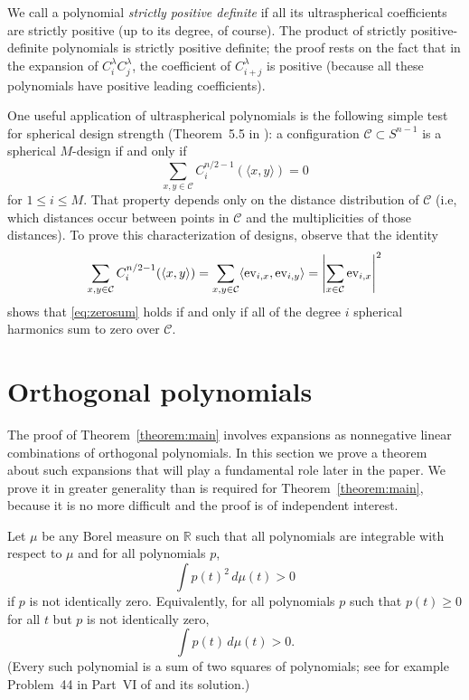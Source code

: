 \documentclass{jams-l}
\theoremstyle{plain}
\numberwithin{theorem}{section}
\theoremstyle{definition}
\numberwithin{equation}{section}
\newcommand{\R}{{\mathbb R}}
\newcommand{\ev}{\mathop{\textup{ev}}\nolimits}
\newcommand{\CodeS}{\mathcal{C}}
\begin{document}
We call a polynomial \textit{strictly positive definite\/} if all
its ultraspherical coefficients are strictly positive (up to its
degree, of course).  The product of strictly positive-definite
polynomials is strictly positive definite;  the proof rests on the
fact that in the expansion of $C_i^\lambda C_j^\lambda$, the
coefficient of $C_{i+j}^\lambda$ is positive (because all these
polynomials have positive leading coefficients).

One useful application of ultraspherical polynomials is the
following simple test for spherical design strength (Theorem~5.5
in \cite{DGS}): a configuration $\CodeS \subset S^{n-1}$ is a
spherical $M$-design if and only if
\begin{equation} \label{eq:zerosum}
\sum_{x,y \in \CodeS} C_i^{n/2-1}(\langle x,y \rangle) = 0
\end{equation}
for $1 \le i \le M$.  That property depends only on the distance
distribution of $\CodeS$ (i.e, which distances occur between
points in $\CodeS$ and the multiplicities of those distances). To
prove this characterization of designs, observe that the identity
$$
\sum_{x,y \in \CodeS} C_i^{n/2-1}(\langle x,y \rangle) = \sum_{x,y
\in \CodeS} \langle \ev_{i,x},\ev_{i,y}\rangle = \left|\sum_{x \in
\CodeS} \ev_{i,x}\right|^2
$$
shows that \eqref{eq:zerosum} holds if and only if all of the
degree $i$ spherical harmonics sum to zero over $\CodeS$.

\section{Orthogonal polynomials}

The proof of Theorem~\ref{theorem:main} involves expansions as
nonnegative linear combinations of orthogonal polynomials.  In
this section we prove a theorem about such expansions that will
play a fundamental role later in the paper.  We prove it in
greater generality than is required for
Theorem~\ref{theorem:main}, because it is no more difficult and
the proof is of independent interest.

Let $\mu$ be any Borel measure on $\R$ such that all polynomials
are integrable with respect to $\mu$ and for all polynomials $p$,
$$
\int p(t)^2 \, d\mu(t) > 0
$$
if $p$ is not identically zero.  Equivalently, for all polynomials
$p$ such that $p(t) \ge 0$ for all $t$ but $p$ is not identically
zero,
$$
\int p(t) \, d\mu(t) > 0.
$$
(Every such polynomial is a sum of two squares of polynomials; see
for example Problem~44 in Part~VI of \cite{PS} and its solution.)
\end{document}
